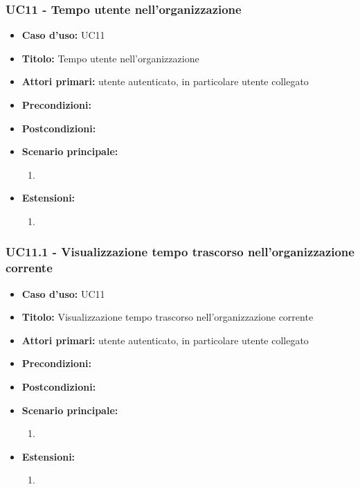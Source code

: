 \documentclass[casi-duso]{subfiles}
\begin{document}
\subsubsection{UC11 - Tempo utente nell'organizzazione}
\label{subsub:uc11utente}
\begin{itemize}
  \item \textbf{Caso d’uso:} UC11
  \item \textbf{Titolo:} Tempo utente nell'organizzazione
  \item \textbf{Attori primari:} utente autenticato, in particolare utente collegato
  \item \textbf{Precondizioni:} 
  \item \textbf{Postcondizioni:}
  \item \textbf{Scenario principale:} 
  \begin{enumerate}
    \item 
  \end{enumerate}  
  \item \textbf{Estensioni:} 
  \begin{enumerate}
    \item 
  \end{enumerate}  
\end{itemize}

\subsubsection{UC11.1 - Visualizzazione tempo trascorso nell'organizzazione corrente}
\label{subsub:uc11utente}
\begin{itemize}
  \item \textbf{Caso d’uso:} UC11
  \item \textbf{Titolo:} Visualizzazione tempo trascorso nell'organizzazione corrente
  \item \textbf{Attori primari:} utente autenticato, in particolare utente collegato
  \item \textbf{Precondizioni:} 
  \item \textbf{Postcondizioni:}
  \item \textbf{Scenario principale:} 
  \begin{enumerate}
    \item 
  \end{enumerate}  
  \item \textbf{Estensioni:} 
  \begin{enumerate}
    \item 
  \end{enumerate}  
\end{itemize}
\end{document}
